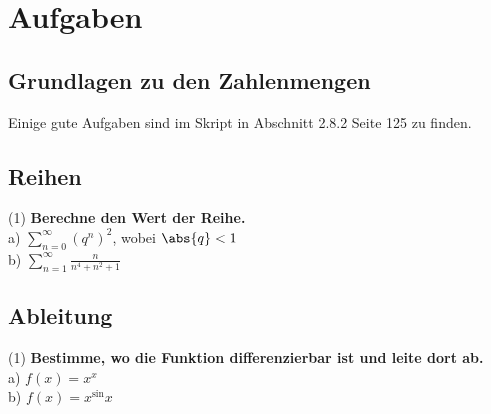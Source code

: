 \chapter{Aufgaben}

\section{Grundlagen zu den Zahlenmengen}
Einige gute Aufgaben sind im Skript in Abschnitt 2.8.2 Seite 125 zu finden.

\section{Reihen}

(1) \textbf{Berechne den Wert der Reihe.} \\
a) $\sum_{n = 0}^{\infty} (q^n)^2$, wobei $\abs{q} < 1$\\
b) $\sum_{n = 1}^{\infty} \frac{n}{n^4+n^2+1}$

\section{Ableitung}
(1) \textbf{Bestimme, wo die Funktion differenzierbar ist und leite dort ab.} \\
a) $f(x)=x^x$ \\
b) $f(x)=x^\sin{x}$

